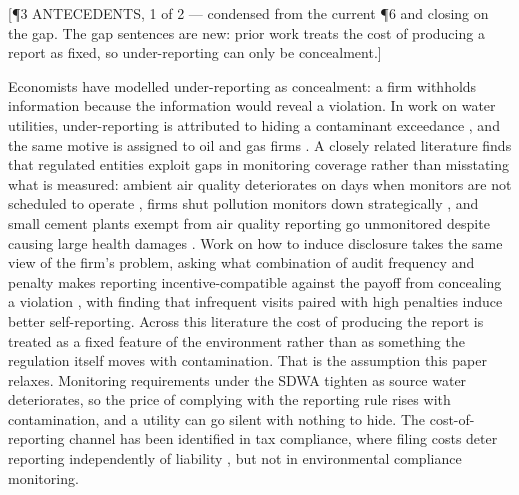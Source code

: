\documentclass[12pt]{article}
\newcommand{\annot}[1]{%
  \par\nobreak\vspace{0.35em}%
  {\footnotesize\sffamily\color{annotcol}\raggedright #1\par}%
  \nobreak\vspace{-0.35em}\nobreak}
\begin{document}
\annot{[\P3 \textbullet{} ANTECEDENTS, 1 of 2 --- condensed from the current \P6 and
closing on the gap. The gap sentences are new: prior work treats the cost of producing a
report as fixed, so under-reporting can only be concealment.]}
Economists have modelled under-reporting as concealment: a firm withholds information
because the information would reveal a violation. In work on water utilities,
under-reporting is attributed to hiding a contaminant exceedance
\parencite{bennear2009sampling, naylor5537637strategic, andarge2025quantifying,
wallsten2008effects, foster2019arsenic}, and the same motive is assigned to oil and gas
firms \parencite{lee2020essays}. A closely related literature finds that regulated
entities exploit gaps in monitoring coverage rather than misstating what is measured:
ambient air quality deteriorates on days when monitors are not scheduled to operate
\parencite{zou2021unwatched}, firms shut pollution monitors down strategically
\parencite{10.1162/rest_a_01477}, and small cement plants exempt from air quality
reporting go unmonitored despite causing large health damages
\parencite{zirogiannis2023polluting}. Work on how to induce disclosure takes the same
view of the firm's problem, asking what combination of audit frequency and penalty makes
reporting incentive-compatible against the payoff from concealing a violation
\parencite{innes1999remediation, foster2013informational, anton2004incentives}, with
\textcite{malik1993self} finding that infrequent visits paired with high penalties induce
better self-reporting. Across this literature the cost of producing the report is treated
as a fixed feature of the environment rather than as something the regulation itself
moves with contamination. That is the assumption this paper relaxes. Monitoring
requirements under the SDWA tighten as source water deteriorates, so the price of
complying with the reporting rule rises with contamination, and a utility can go silent
with nothing to hide. The cost-of-reporting channel has been identified in tax
compliance, where filing costs deter reporting independently of liability
\parencite{tazhitdinova2018reducing}, but not in environmental compliance monitoring.
\end{document}
